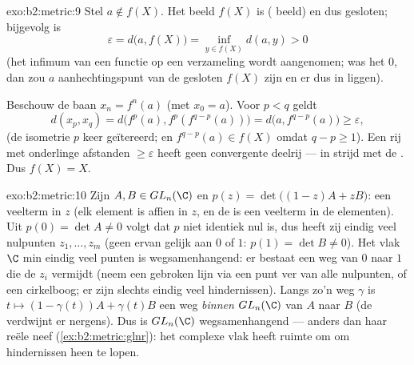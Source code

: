 \begin{solution}{exo:b2:metric:9}
Stel $a \notin f(X)$. Het beeld $f(X)$ is  ( beeld)
en dus gesloten; bijgevolg is
\[
\varepsilon = d\bigl(a, f(X)\bigr)
= \inf_{y \in f(X)} d(a, y) > 0
\]
(het infimum van een  functie op een  verzameling
wordt aangenomen; was het $0$, dan zou $a$ aanhechtingspunt van de
gesloten $f(X)$ zijn en er dus in liggen).

Beschouw de baan $x_n = f^n(a)$ (met $x_0 = a$). Voor $p < q$ geldt
\[
d(x_p, x_q) = d\bigl(f^p(a), f^p(f^{q-p}(a))\bigr)
= d\bigl(a, f^{q-p}(a)\bigr) \geq \varepsilon,
\]
(de isometrie $p$ keer geïtereerd; en $f^{q-p}(a) \in f(X)$ omdat
$q - p \geq 1$). Een rij met onderlinge afstanden $\geq
\varepsilon$ heeft geen convergente deelrij --- in strijd met de
. Dus $f(X) = X$.
\end{solution}

\begin{solution}{exo:b2:metric:10}
Zijn $A, B \in GL_n(\C)$ en $p(z) = \det\bigl((1-z)A + zB\bigr)$:
een veelterm in $z$ (elk element is affien in $z$, en de
 is een veelterm in de elementen). Uit $p(0) = \det A
\neq 0$ volgt dat $p$ niet identiek nul is, dus heeft zij eindig
veel nulpunten $z_1, \dots, z_m$ (geen ervan gelijk aan $0$ of $1$:
$p(1) = \det B \neq 0$). Het vlak $\C$ min eindig veel punten is
wegsamenhangend: er bestaat een weg van $0$ naar $1$ die de $z_i$
vermijdt (neem een gebroken lijn via een punt ver van alle
nulpunten, of een cirkelboog; er zijn slechts eindig veel
hindernissen). Langs zo'n weg $\gamma$ is $t \mapsto (1 -
\gamma(t))A + \gamma(t)B$ een  weg \emph{binnen}
$GL_n(\C)$ van $A$ naar $B$ (de  verdwijnt er nergens).
Dus is $GL_n(\C)$ wegsamenhangend --- anders dan haar reële neef
(\cref{ex:b2:metric:glnr}): het complexe vlak heeft ruimte om om
hindernissen heen te lopen.
\end{solution}

